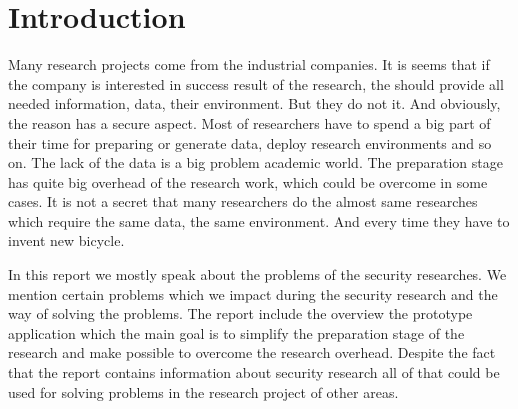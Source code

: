 
\section{Introduction}

Many research projects come from the industrial companies. It is seems that if the company is interested in success result of the research, the should provide all needed information, data, their environment. But they do not it. And obviously, the reason has a secure aspect. Most of researchers have to spend a big part of their time for preparing or generate data, deploy research environments and so on. The lack of the data is a big problem academic world. The preparation stage has quite big overhead of the research work, which could be overcome in some cases. It is not a secret that many researchers do the almost same researches which require the same data, the same environment. And every time they have to invent new bicycle. 

In this report we mostly speak about the problems of the security researches. We mention certain problems which we impact during the security research and the way of solving the problems. The report include the overview the prototype application which the main goal is to simplify the preparation stage of the research and make possible to overcome the research overhead. Despite the fact that the report contains information about security research all of that could be used for solving problems in the research project of other areas.      
